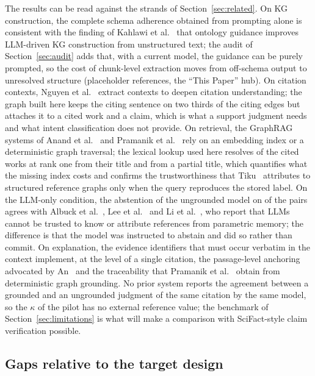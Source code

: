 \documentclass[lettersize,journal]{IEEEtran}
\begin{document}
The results can be read against the strands of Section~\ref{sec:related}. On KG construction, the complete schema adherence obtained from prompting alone is consistent with the finding of Kahlawi et al.~\cite{kahlawi2026ontology} that ontology guidance improves LLM-driven KG construction from unstructured text; the audit of Section~\ref{sec:audit} adds that, with a current model, the guidance can be purely prompted, so the cost of chunk-level extraction moves from off-schema output to unresolved structure (placeholder references, the ``This Paper'' hub). On citation contexts, Nguyen et al.~\cite{nguyen2026deepening} extract contexts to deepen citation understanding; the graph built here keeps the citing sentence on two thirds of the citing edges but attaches it to a cited work and a claim, which is what a support judgment needs and what intent classification does not provide. On retrieval, the GraphRAG systems of Anand et al.~\cite{anand2023ctg} and Pramanik et al.~\cite{pramanik2026mechanistic} rely on an embedding index or a deterministic graph traversal; the lexical lookup used here resolves  of the cited works at rank one from their title and  from a partial title, which quantifies what the missing index costs and confirms the trustworthiness that Tiku~\cite{tiku2025benchmarking} attributes to structured reference graphs only when the query reproduces the stored label. On the LLM-only condition, the abstention of the ungrounded model on \pilotBInsufficientEvidencePct{} of the pairs agrees with Albuck et al.~\cite{albuck2024precision}, Lee et al.~\cite{lee2026can} and Li et al.~\cite{li2024verifiable}, who report that LLMs cannot be trusted to know or attribute references from parametric memory; the difference is that the model was instructed to abstain and did so rather than commit. On explanation, the evidence identifiers that must occur verbatim in the context implement, at the level of a single citation, the passage-level anchoring advocated by An~\cite{an2026evidence} and the traceability that Pramanik et al.~\cite{pramanik2026mechanistic} obtain from deterministic graph grounding. No prior system reports the agreement between a grounded and an ungrounded judgment of the same citation by the same model, so the $\kappa$ of the pilot has no external reference value; the benchmark of Section~\ref{sec:limitations} is what will make a comparison with SciFact-style claim verification possible.

\subsection{Gaps relative to the target design}
\end{document}
